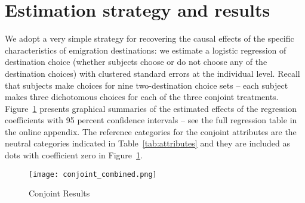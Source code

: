 \documentclass[12pt]{article}
\begin{document}


\section*{Estimation strategy and results}

\par We adopt a very simple strategy for recovering the causal effects of the specific characteristics of emigration destinations: we estimate a logistic regression of destination choice (whether subjects choose or do not choose any of the destination choices) with clustered standard errors at the individual level. Recall that subjects make choices for nine two-destination choice sets -- each subject makes three dichotomous choices for each of the three conjoint treatments. Figure~\ref{fig:treatment_combined} presents graphical summaries of the estimated effects of the regression coefficients with 95 percent confidence intervals -- see the full regression table in the online appendix. The reference categories for the conjoint attributes are the neutral categories indicated in Table~\ref{tab:attributes} and they are included as dots with coefficient zero in Figure~\ref{fig:treatment_combined}.

\begin{figure}%
\caption{Conjoint Results}\label{fig:treatment_combined}
\centerline{\texttt{[image: conjoint\_combined.png]}}
\end{figure}
\end{document}

